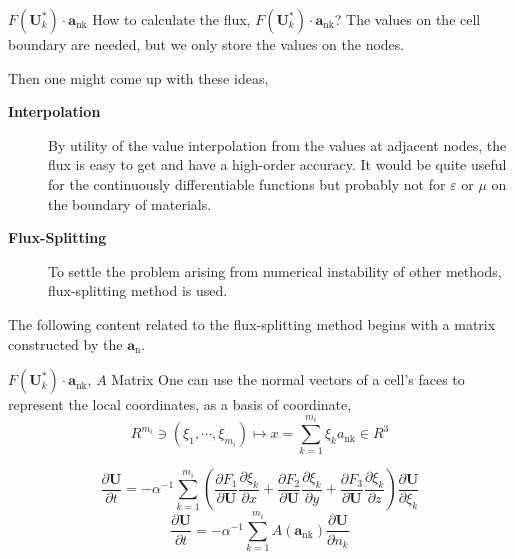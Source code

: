 \begin{frame}{$F\left(\boldsymbol{U}_{k}^{*}\right) \cdot \boldsymbol{a}_{\mathrm{nk}}$}
How to calculate the flux, $F\left(\boldsymbol{U}_{k}^{*}\right) \cdot \boldsymbol{a}_{\mathrm{nk}}$? The values on the cell boundary are needed, but we only store the values on the nodes.

Then one might come up with these ideas,

\begin{description}
\item[\textbf{Interpolation}] By utility of the value interpolation from the values at adjacent nodes, the flux is easy to get and have a high-order accuracy. It would be quite useful for the continuously differentiable functions but probably not for $\varepsilon$ or $\mu$ on the boundary of materials. 
\item[\textbf{Flux-Splitting}] To settle the problem arising from numerical instability of other methods, flux-splitting method is used.
\end{description}
The following content related to the flux-splitting method begins with a matrix constructed by the $\boldsymbol{a}_{\mathrm{n}}$.

\end{frame}

\begin{frame}{$F\left(\boldsymbol{U}_{k}^{*}\right) \cdot \boldsymbol{a}_{\mathrm{nk}}$, $A$ Matrix}
One can use the normal vectors of a cell's faces to represent the local coordinates, as a basis of coordinate,
\begin{equation}
R^{m_{i}} \ni\left(\xi_{1}, \cdots, \xi_{m_{i}}\right) \mapsto x=\sum_{k=1}^{m_{i}} \xi_{k} a_{\mathrm{nk}} \in R^{3}
\end{equation}

\begin{equation}
\frac{\partial \boldsymbol{U}}{\partial t}=-\alpha^{-1} \sum_{k=1}^{m_{i}}\left(\frac{\partial F_{1}}{\partial \boldsymbol{U}} \frac{\partial \xi_{k}}{\partial x}+\frac{\partial F_{2}}{\partial \boldsymbol{U}} \frac{\partial \xi_{k}}{\partial y}+\frac{\partial F_{3}}{\partial \boldsymbol{U}} \frac{\partial \xi_{k}}{\partial z}\right) \frac{\partial \boldsymbol{U}}{\partial \xi_{k}}
\end{equation}
\begin{equation}
\frac{\partial \boldsymbol{U}}{\partial t}=-\alpha^{-1} \sum_{k=1}^{m_{i}} A\left(\boldsymbol{a}_{\mathrm{nk}}\right) \frac{\partial \boldsymbol{U}}{\partial n_{k}}
\end{equation}
\end{frame}


